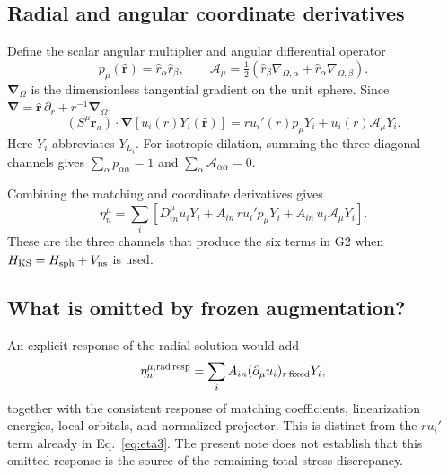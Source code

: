 \documentclass[11pt]{article}
\newcommand{\pa}{\partial_\mu}
\begin{document}
\subsection{Radial and angular coordinate derivatives}
Define the scalar angular multiplier and angular differential operator
\begin{equation}
 p_\mu(\widehat{\mathbf r})=\hat r_\alpha\hat r_\beta,\qquad
 \mathscr A_\mu=\tfrac12
  (\hat r_\beta\nabla_{\Omega,\alpha}
       +\hat r_\alpha\nabla_{\Omega,\beta}).
 \label{eq:angular}
\end{equation}
$\boldsymbol\nabla_\Omega$ is the dimensionless tangential gradient
on the unit sphere. Since
$\boldsymbol\nabla=\widehat{\mathbf r}\,\partial_r
                     +r^{-1}\boldsymbol\nabla_\Omega$,
\begin{equation}
 (S^\mu\mathbf r_a)\cdot\boldsymbol\nabla
          [u_i(r)Y_i(\widehat{\mathbf r})]
 =r u_i'(r)p_\mu Y_i+u_i(r)\mathscr A_\mu Y_i.
 \label{eq:coordderiv}
\end{equation}
Here $Y_i$ abbreviates $Y_{L_i}$.
For isotropic dilation, summing the three diagonal channels gives
$\sum_\alpha p_{\alpha\alpha}=1$ and
$\sum_\alpha\mathscr A_{\alpha\alpha}=0$.

Combining the matching and coordinate derivatives gives
\begin{equation}
 \boxed{\eta_n^\mu=\sum_i\left[
 D^\mu_{in}u_iY_i
 +A_{in}\,r u_i'p_\mu Y_i
 +A_{in}\,u_i\mathscr A_\mu Y_i\right].}
 \label{eq:eta3}
\end{equation}
These are the three channels that produce the six terms in G2 when
$H_{\rm KS}=H_{\rm sph}+V_{\rm ns}$ is used.

\subsection{What is omitted by frozen augmentation?}
An explicit response of the radial solution would add
\begin{equation}
 \eta_n^{\mu,\rm rad\,resp}
       =\sum_i A_{in}(\pa u_i)_{r\,\rm fixed}Y_i,
 \label{eq:radialresponse}
\end{equation}
together with the consistent response of matching coefficients,
linearization energies, local orbitals, and normalized projector.
This is distinct from the $r u_i'$ term already in Eq.~\eqref{eq:eta3}.
The present note does not establish that this omitted response is the
source of the remaining total-stress discrepancy.
\end{document}
